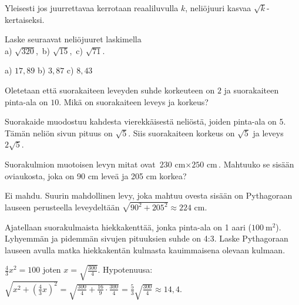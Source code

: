 \begin{tehtavasivu}
\begin{tehtava}
\begin{vastaus}
        Yleisesti jos juurrettavaa kerrotaan reaaliluvulla $k$, neliöjuuri kasvaa $\sqrt{k}$-kertaiseksi.
        \end{vastaus}
\end{tehtava}

\begin{tehtava}
Laske seuraavat neliöjuuret laskimella\\
a) $\sqrt{320}$,\ b) $\sqrt{15}$,\ c) $\sqrt{71}$.
\begin{vastaus}
a) $17{,}89$ b) $3{,}87$ c) $8{,}43$
\end{vastaus}
\end{tehtava}


\begin{tehtava}
Oletetaan että suorakaiteen leveyden suhde korkeuteen on $2$ ja suorakaiteen pinta-ala on $10$. Mikä on suorakaiteen 
leveys ja korkeus?
\begin{vastaus}
Suorakaide muodostuu kahdesta vierekkäisestä neliöstä, joiden pinta-ala on $5$. Tämän neliön sivun pituus on $\sqrt{5}$.
Siis suorakaiteen korkeus on $\sqrt{5}$ ja leveys $2\sqrt{5}$.
\end{vastaus}
\end{tehtava}

\begin{tehtava}
        Suorakulmion muotoisen levyn mitat ovat $\text{230 cm} \times \text{250 cm}$. Mahtuuko se sisään oviaukosta, joka on 90 cm leveä ja 205 cm korkea?
       
        \begin{vastaus}
        Ei mahdu. Suurin mahdollinen levy, joka mahtuu ovesta sisään on Pythagoraan lauseen perusteella leveydeltään $\sqrt{90^2+205^2}\approx 224$ cm.
        \end{vastaus}
\end{tehtava}


\begin{tehtava}
Ajatellaan suorakulmaista hiekkakenttää, jonka pinta-ala on 1 aari ($100~\mathrm{m}^2$). Lyhyemmän ja pidemmän sivujen 
pituuksien suhde on 4:3. Laske Pythagoraan lauseen avulla matka hiekkakentän kulmasta kauimmaisena olevaan kulmaan.
\begin{vastaus}
$\frac{4}{3}x^2=100$ joten $x = \sqrt{\frac{300}{4}}$. 
Hypotenuusa: $\sqrt{x^2 + (\frac{4}{3}x)^2}=\sqrt{\frac{300}{4}+\frac{16}{9}\cdot \frac{300}{4}}
=\frac{5}{3}\sqrt{\frac{300}{4}}\approx 14{,}4$.
\end{vastaus}
\end{tehtava}


\end{tehtavasivu}
